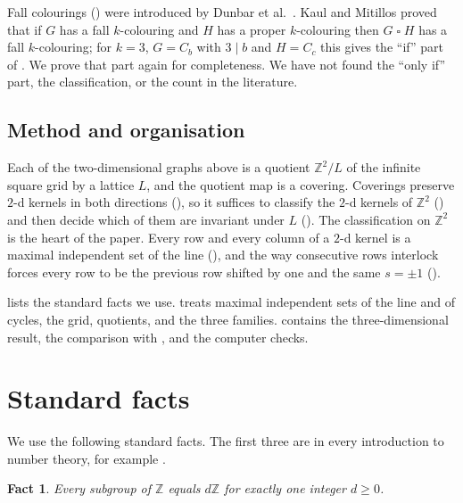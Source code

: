 \documentclass[11pt]{article}
\theoremstyle{plain}
\newtheorem{fact}[fact]{Fact}
\theoremstyle{definition}
\theoremstyle{remark}
\newcommand{\Z}{\mathbb{Z}}
\newcommand{\T}{\mathbin{\square}}
\begin{document}
Fall colourings () were introduced by Dunbar et al.~\cite{Dunbar2000}. Kaul
and Mitillos \cite{KM2019} proved that if $G$ has a fall $k$-colouring and $H$ has a proper
$k$-colouring then $G \T H$ has a fall $k$-colouring; for $k = 3$, $G = C_b$ with $3 \mid b$
and $H = C_c$ this gives the ``if'' part of . We prove that
part again for completeness. We have not found the ``only if'' part, the classification, or
the count in the literature.

\subsection{Method and organisation}

Each of the two-dimensional graphs above is a quotient $\Z^2/L$ of the infinite square grid by
a lattice $L$, and the quotient map is a covering. Coverings preserve $2$-d kernels in both
directions (), so it suffices to classify the $2$-d kernels of $\Z^2$
() and then decide which of them are invariant under $L$
(). The classification on $\Z^2$ is the heart of the paper. Every row and
every column of a $2$-d kernel is a maximal independent set of the line
(), and the way consecutive rows interlock forces every row to be the previous
row shifted by one and the same $s = \pm 1$ ().

 lists the standard facts we use.  treats maximal independent
sets of the line and of cycles,  the grid,  quotients,
and  the three families.  contains the three-dimensional
result,  the comparison with \cite{BW2016}, and
 the computer checks.

\section{Standard facts}\label{sec:facts}

We use the following standard facts. The first three are in every introduction to number
theory, for example \cite{NZM}.

\begin{fact}\label{fact:subgroups}
Every subgroup of $\Z$ equals $d\Z$ for exactly one integer $d \ge 0$.
\end{fact}
\end{document}
